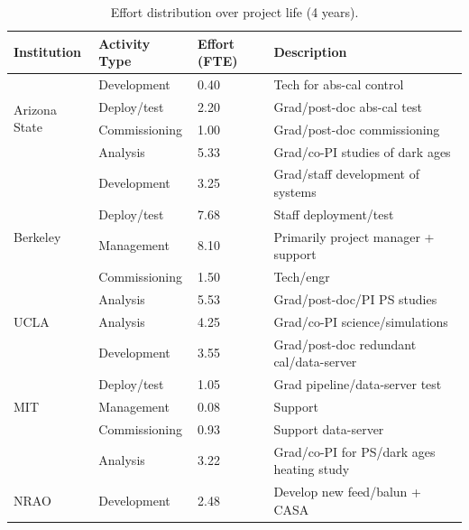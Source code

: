 \documentclass[preprint]{aastex}
\begin{document}
\begin{table}[t]
\caption{Effort distribution over project life (4 years).}
\label{tab:fte}
\begin{tabular}{| p{1in} | p{1in} | p{0.5in} | p{3in} |} \hline
\textbf{Institution}  &  \textbf{Activity Type}  &  \textbf{Effort (FTE)} & \textbf{Description} \\ \hline
\multirow{4}{*}{Arizona State} & Development    & 0.40 & Tech for abs-cal control \\ 
                                                & Deploy/test       & 2.20 & Grad/post-doc abs-cal test\\
                                                & Commissioning & 1.00  & Grad/post-doc commissioning \\ \hline
                                                & Analysis      & 5.33   & Grad/co-PI studies of dark ages \\ 
\multirow{5}{*}{Berkeley}         & Development    & 3.25  & Grad/staff development of systems \\ 
                                                & Deploy/test      & 7.68  & Staff deployment/test \\ 
                                                & Management  & 8.10  & Primarily project manager + support \\
                                                & Commissioning  & 1.50 & Tech/engr  \\ \hline
                                                &  Analysis     & 5.53   & Grad/post-doc/PI PS studies \\ 
\multirow{1}{*}{UCLA}             & Analysis   & 4.25  & Grad/co-PI science/simulations  \\  \hline
\multirow{5}{*}{MIT}                 & Development & 3.55 & Grad/post-doc redundant cal/data-server \\
                                                & Deploy/test   & 1.05 & Grad pipeline/data-server test \\
                                                & Management  & 0.08 & Support \\
                                                & Commissioning  & 0.93  & Support data-server\\ \hline
                                                & Analysis         & 3.22 & Grad/co-PI for PS/dark ages heating study \\ 
\multirow{5}{*}{NRAO}            & Development & 2.48 & Develop new feed/balun + CASA \\ 

\end{tabular}
\end{table}
\end{document}
